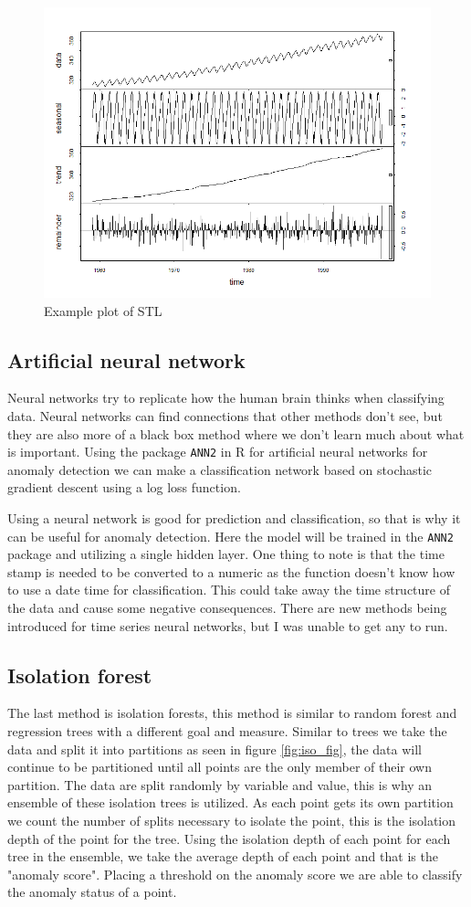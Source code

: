 \documentclass{article}
\begin{document}
\begin{figure}[ht]
    \centering
    \includegraphics[width=.7\textwidth]{stl_model.png}
    \caption{Example plot of STL}
    \label{fig:stl_fig}
\end{figure}

\subsection{Artificial neural network}
Neural networks try to replicate how the human brain thinks when classifying data. Neural networks can find connections that other methods don't see, but they are also more of a black box method where we don't learn much about what is important. Using the package \texttt{ANN2} in R for artificial neural networks for anomaly detection we can make a classification network based on stochastic gradient descent using a log loss function.

Using a neural network is good for prediction and classification, so that is why it can be useful for anomaly detection. Here the model will be trained in the \texttt{ANN2} package and utilizing a single hidden layer. One thing to note is that the time stamp is needed to be converted to a numeric as the function doesn't know how to use a date time for classification. This could take away the time structure of the data and cause some negative consequences. There are new methods being introduced for time series neural networks, but I was unable to get any to run.

\subsection{Isolation forest}
The last method is isolation forests, this method is similar to random forest and regression trees with a different goal and measure. Similar to trees we take the data and split it into partitions as seen in figure \ref{fig:iso_fig}, the data will continue to be partitioned until all points are the only member of their own partition. The data are split randomly by variable and value, this is why an ensemble of these isolation trees is utilized. As each point gets its own partition we count the number of splits necessary to isolate the point, this is the isolation depth of the point for the tree. Using the isolation depth of each point for each tree in the ensemble, we take the average depth of each point and that is the "anomaly score". Placing a threshold on the anomaly score we are able to classify the anomaly status of a point.
\end{document}
